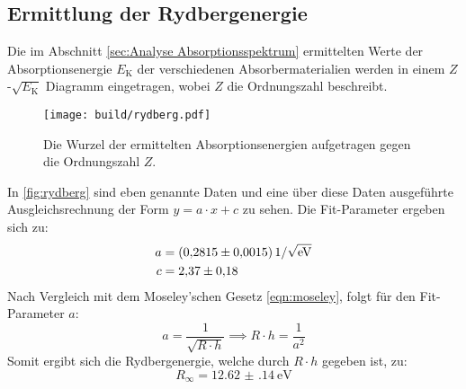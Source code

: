 \subsection{Ermittlung der Rydbergenergie}

Die im Abschnitt \ref{sec:Analyse Absorptionsspektrum} ermittelten Werte der Absorptionsenergie $E_{\text{K}}$ der verschiedenen Absorbermaterialien werden
in  einem $Z$-$\sqrt{E_{\text{K}}}$ Diagramm eingetragen, wobei $Z$ die Ordnungszahl beschreibt.

\begin{figure}[H]
  \centering
  \texttt{[image: build/rydberg.pdf]}
  \caption{Die Wurzel der ermittelten Absorptionsenergien aufgetragen gegen die Ordnungszahl $Z$.}
  \label{fig:rydberg}
\end{figure}

\noindent
In \autoref{fig:rydberg} sind eben genannte Daten und eine über diese Daten ausgeführte Ausgleichsrechnung der Form $y = a \cdot x + c $ zu sehen.
Die Fit-Parameter ergeben sich zu:
\begin{align*}
  a &= \SI{0.2815 \pm 0.0015}{1\per\sqrt{\electronvolt}}\\
  c &= \num{2.37 \pm 0.18}
\end{align*}
Nach Vergleich mit dem Moseley'schen Gesetz \eqref{eqn:moseley}, folgt für den Fit-Parameter $a$:
\begin{equation*}
  a = \frac{1}{\sqrt{R\cdot h}} \implies R \cdot h = \frac{1}{a^2}
\end{equation*}
Somit ergibt sich die Rydbergenergie, welche durch $R \cdot h $ gegeben ist, zu:
\begin{equation*}
  R_{\infty} = \SI{12.62(14)}{\electronvolt}
\end{equation*}